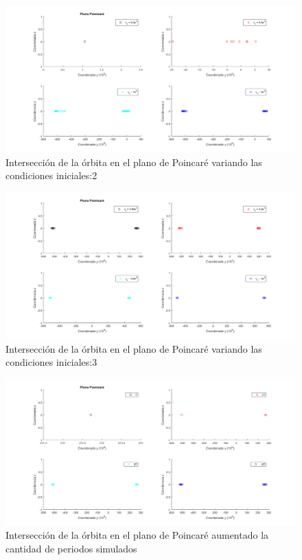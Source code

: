 \documentclass[11pt,singlespacing,liststotoc,headsepline,a4paper]{article}
\begin{document}
\begin{figure}[H]
	\centering
	\includegraphics[width=1\textwidth]{PointCareCI_2.png}
	\caption{Intersección de la órbita en el plano de Poincaré variando las condiciones iniciales:2}
	\label{PointCareCI_2}
\end{figure}

\begin{figure}[H]
	\centering
	\includegraphics[width=1\textwidth]{PointCareCI_3.png}
	\caption{Intersección de la órbita en el plano de Poincaré variando las condiciones iniciales:3}
	\label{PointCareCI_3}
\end{figure}

\begin{figure}[H]
	\centering
	\includegraphics[width=1\textwidth]{PointCareT_1.png}
	\caption{Intersección de la órbita en el plano de Poincaré aumentado la cantidad de periodos simulados}
	\label{PointCareT_1}
\end{figure}
\end{document}
